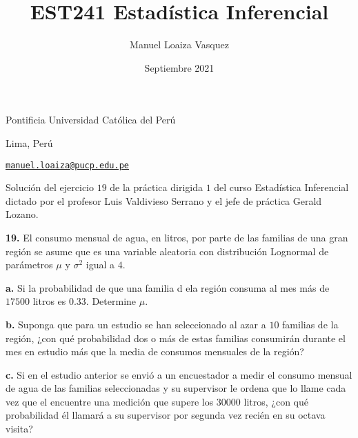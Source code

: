 \documentclass{article}
\title{EST241 Estad\'istica Inferencial}
\author{Manuel Loaiza Vasquez}
\date{Septiembre 2021}
\newenvironment{statement}[1]{\smallskip\noindent\color[rgb]{1.00,0.00,0.50} {\bf #1.}}{}
\theoremstyle{definition}
\theoremstyle{remark}
\begin{document}
\maketitle

\vspace*{-0.25in}
\centerline{Pontificia Universidad Cat\'olica del Per\'u}
\centerline{Lima, Per\'u}
\centerline{\href{mailto:manuel.loaiza@pucp.edu.pe}{{\tt manuel.loaiza@pucp.edu.pe}}}
\vspace*{0.15in}

\begin{framed}
  Soluci\'on del ejercicio $19$ de la pr\'actica dirigida $1$ del curso
  Estad\'istica Inferencial dictado por el profesor Luis Valdivieso Serrano
  y el jefe de pr\'actica Gerald Lozano.
\end{framed}

\begin{statement}{19}
  El consumo mensual de agua, en litros, por parte de las familias de una gran
  regi\'on se asume que es una variable aleatoria con distribuci\'on Lognormal
  de par\'ametros $\mu$ y $\sigma^2$ igual a $4$.
\end{statement}

\begin{statement}{a}
  Si la probabilidad de que una familia d ela regi\'on consuma al mes m\'as de
  $17500$ litros es $0.33$. Determine $\mu$.
\end{statement}

\begin{statement}{b}
  Suponga que para un estudio se han seleccionado al azar a $10$ familias de la
  regi\'on, ¿con qu\'e probabilidad dos o m\'as de estas familias consumir\'an
  durante el mes en estudio m\'as que la media de consumos mensuales de la regi\'on?
\end{statement}

\begin{statement}{c}
  Si en el estudio anterior se envi\'o a un encuestador a medir el consumo
  mensual de agua de las familias seleccionadas y su supervisor le ordena que lo
  llame cada vez que el encuentre una medici\'on que supere los $30000$ litros,
  ¿con qu\'e probabilidad \'el llamar\'a a su supervisor por segunda vez reci\'en
  en su octava visita?
\end{statement}
\end{document}
